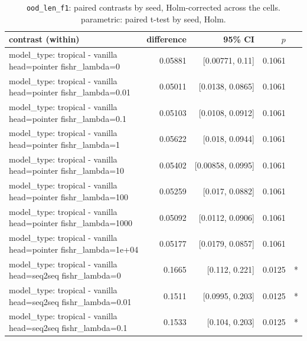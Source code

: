 \documentclass[10pt]{article}
\makeatletter
\newcommand{\stackcell}[1]{\begin{tabular}[t]{@{}l@{}}#1\end{tabular}}
\makeatother
\begin{document}
{\small
\begin{longtable}{lrrrl}
\caption{\texttt{ood\_len\_f1}: paired contrasts by seed, Holm-corrected across the cells. parametric: paired t-test by seed, Holm.}\label{tab:paired-ood_len_f1}\\
\toprule
contrast (within) & difference & 95\% CI & $p$ & \\
\midrule
\endhead
\stackcell{model\_type: tropical - vanilla\\\footnotesize head=pointer fishr\_lambda=0 } & 0.05881 & [0.00771, 0.11] & 0.1061 & \\
\stackcell{model\_type: tropical - vanilla\\\footnotesize head=pointer fishr\_lambda=0.01 } & 0.05011 & [0.0138, 0.0865] & 0.1061 & \\
\stackcell{model\_type: tropical - vanilla\\\footnotesize head=pointer fishr\_lambda=0.1 } & 0.05103 & [0.0108, 0.0912] & 0.1061 & \\
\stackcell{model\_type: tropical - vanilla\\\footnotesize head=pointer fishr\_lambda=1 } & 0.05622 & [0.018, 0.0944] & 0.1061 & \\
\stackcell{model\_type: tropical - vanilla\\\footnotesize head=pointer fishr\_lambda=10 } & 0.05402 & [0.00858, 0.0995] & 0.1061 & \\
\stackcell{model\_type: tropical - vanilla\\\footnotesize head=pointer fishr\_lambda=100 } & 0.05259 & [0.017, 0.0882] & 0.1061 & \\
\stackcell{model\_type: tropical - vanilla\\\footnotesize head=pointer fishr\_lambda=1000 } & 0.05092 & [0.0112, 0.0906] & 0.1061 & \\
\stackcell{model\_type: tropical - vanilla\\\footnotesize head=pointer fishr\_lambda=1e+04 } & 0.05177 & [0.0179, 0.0857] & 0.1061 & \\
\stackcell{model\_type: tropical - vanilla\\\footnotesize head=seq2seq fishr\_lambda=0 } & 0.1665 & [0.112, 0.221] & 0.0125 & *\\
\stackcell{model\_type: tropical - vanilla\\\footnotesize head=seq2seq fishr\_lambda=0.01 } & 0.1511 & [0.0995, 0.203] & 0.0125 & *\\
\stackcell{model\_type: tropical - vanilla\\\footnotesize head=seq2seq fishr\_lambda=0.1 } & 0.1533 & [0.104, 0.203] & 0.0125 & *\\

\end{longtable}}
\end{document}
